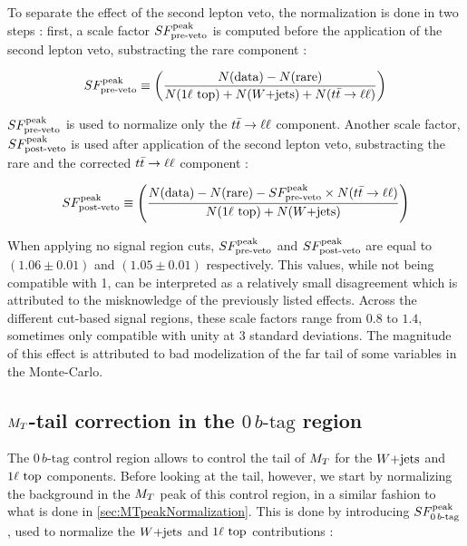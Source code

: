     To separate the effect of the second lepton veto, the  normalization is done in two
    steps : first, a scale factor $SF_{\text{pre-veto}}^{\text{peak}}$ is computed before the application of the
    second lepton veto, substracting the rare component :

    \begin{equation}
        SF_{\text{pre-veto}}^{\text{peak}} \equiv \left( \frac{N(\text{data}) - N(\text{rare})}{N(1\ell~\text{top}) + N(\text{$W$+jets}) + N(t\bar{t} \rightarrow \ell \ell)} \right)
        \label{eq:SFpreDefinition}
    \end{equation}

    $SF_{\text{pre-veto}}^{\text{peak}}$ is used to normalize only the $t\bar{t} \rightarrow \ell \ell$ component. Another scale factor,
    $SF_{\text{post-veto}}^{\text{peak}}$ is used after application of the second lepton veto, substracting the rare
    and the corrected $t\bar{t} \rightarrow \ell \ell$ component :

    \begin{equation}
        SF_{\text{post-veto}}^{\text{peak}} \equiv \left( \frac{N(\text{data}) - N(\text{rare}) - SF_{\text{pre-veto}}^{\text{peak}} \times N(t\bar{t} \rightarrow \ell \ell)}{N(1\ell~\text{top}) + N(\text{$W$+jets})} \right)
        \label{eq:SFpostDefinition}
    \end{equation}

     When applying no signal region cuts, $SF_{\text{pre-veto}}^{\text{peak}}$ and $SF_{\text{post-veto}}^{\text{peak}}$ are equal to
     $(1.06 \pm 0.01)$ and $(1.05 \pm 0.01)$ respectively. This values, while not
     being compatible with 1, can be interpreted as a relatively small disagreement
     which is attributed to the misknowledge of the previously listed effects. Across the
     different cut-based signal regions, these scale factors range from $0.8$ to $1.4$,
     sometimes only compatible with unity at 3 standard deviations. The magnitude of this
     effect is attributed to bad modelization of the far tail of some variables in the
     Monte-Carlo.

        \subsection{$M_T$-tail correction in the $0\, b\text{-tag}$ region \label{sec:MTtailCorrection}}

    The $0\, b\text{-tag}$ control region allows to control the tail of $M_T$ for the $\text{$W$+jets}$ and
    $1\ell~\text{top}$ components. Before looking at the tail, however, we start by normalizing
    the background in the $M_T$ peak of this control region, in a similar fashion to what
    is done in \ref{sec:MTpeakNormalization}. This is done by introducing $SF_{0\, b\text{-tag}}^{\text{peak}}$,
    used to normalize the $\text{$W$+jets}$ and $1\ell~\text{top}$ contributions :

